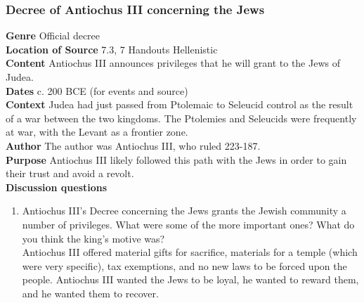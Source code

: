 \documentclass{article}
\begin{document}
\subsubsection*{Decree of Antiochus III concerning the Jews}
\textbf{Genre}
Official decree \\
\textbf{Location of Source}
7.3, 7 Handouts Hellenistic \\
\textbf{Content}
Antiochus III announces privileges that he will grant to the Jews of Judea. \\
\textbf{Dates}
c. 200 BCE (for events and source) \\
\textbf{Context}
Judea had just passed from Ptolemaic to Seleucid control as the result of a war between
the two kingdoms.  The Ptolemies and Seleucids were frequently at war, with the Levant
as a frontier zone. \\
\textbf{Author}
The author was Antiochus III, who ruled 223-187. \\
\textbf{Purpose}
Antiochus III likely followed this path with the Jews in order to gain their trust and avoid a
revolt. \\
\textbf{Discussion questions}
\begin{enumerate}
  \item Antiochus III’s Decree concerning the Jews grants the Jewish community a number
  of privileges. What were some of the more important ones? What do you think the king’s
  motive was? \\
  Antiochus III offered material gifts for sacrifice, materials for a temple (which were very specific),
  tax exemptions, and no new laws to be forced upon the people. Antiochus III wanted the
  Jews to be loyal, he wanted to reward them, and he wanted them to recover.
\end{enumerate}
\end{document}
